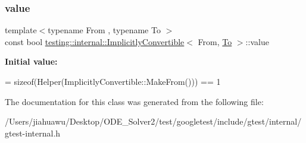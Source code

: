 \subsubsection{\texorpdfstring{value}{value}}
{\footnotesize\ttfamily template$<$typename From , typename To $>$ \\
const bool \mbox{\hyperlink{classtesting_1_1internal_1_1_implicitly_convertible}{testing\+::internal\+::\+Implicitly\+Convertible}}$<$ From, \mbox{\hyperlink{classtesting_1_1internal_1_1_to}{To}} $>$\+::value\hspace{0.3cm}{\ttfamily [static]}}

{\bfseries Initial value\+:}
\begin{DoxyCode}
=
      \textcolor{keyword}{sizeof}(Helper(ImplicitlyConvertible::MakeFrom())) == 1
\end{DoxyCode}


The documentation for this class was generated from the following file\+:\begin{DoxyCompactItemize}
\item 
/\+Users/jiahuawu/\+Desktop/\+O\+D\+E\+\_\+\+Solver2/test/googletest/include/gtest/internal/gtest-\/internal.\+h\end{DoxyCompactItemize}
